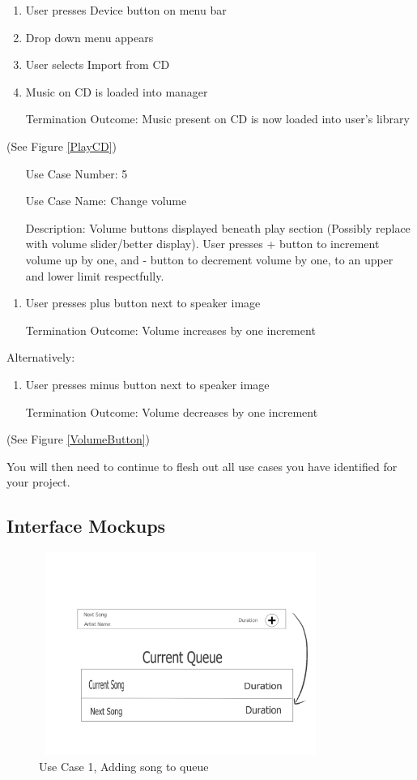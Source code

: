 \documentclass[10pt,conference,onecolumn,compsoc]{IEEEtran}
\begin{document}
\begin{enumerate}
\item User presses Device button on menu bar
\item Drop down menu appears
\item User selects Import from CD
\item Music on CD is loaded into manager
\item [Termination Outcome:] Music present on CD is now loaded into user's library
\end{enumerate}

(See Figure \ref{PlayCD})

\begin{itemize}
\item[Use Case Number:] 5
\item[Use Case Name:] Change volume
\item[Description:] Volume buttons displayed beneath play section (Possibly replace with volume slider/better display). User presses + button to increment volume up by one, and - button to decrement volume by one, to an upper and lower limit respectfully.
\end{itemize}

\begin{enumerate}
\item User presses plus button next to speaker image
\item [Termination Outcome:] Volume increases by one increment
\end{enumerate}

Alternatively:
\begin{enumerate}
\item User presses minus button next to speaker image
\item [Termination Outcome:] Volume decreases by one increment
\end{enumerate}

(See Figure \ref{VolumeButton})

You will then need to continue to flesh out all use cases you have identified for your project.

\subsection{Interface Mockups}

\begin{figure}[ht!]
\includegraphics[height=250px, width=350px]{Add_Song_Queue_Mock_Up.jpg}
\caption{Use Case 1, Adding song to queue}
\label{AddSong}
\end{figure}
\end{document}
